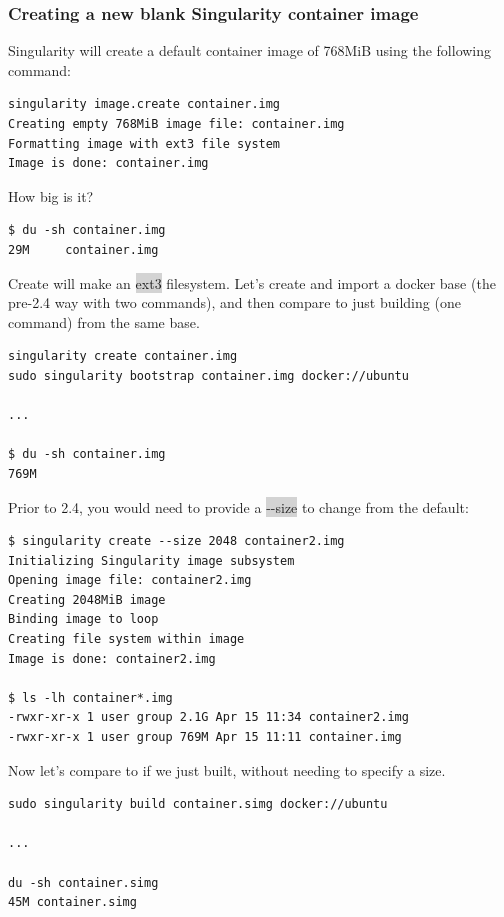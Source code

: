 \documentclass[a4paper]{article}
\begin{document}
	\subsubsection{Creating a new blank Singularity container image}
	
	Singularity will create a default container image of 768MiB using the following command:
	
\begin{lstlisting}[frame=single]
singularity image.create container.img
Creating empty 768MiB image file: container.img
Formatting image with ext3 file system
Image is done: container.img
\end{lstlisting}	
	
How big is it? \\[0.1in]

\begin{lstlisting}[frame=single]
$ du -sh container.img 
29M     container.img
\end{lstlisting}	

Create will make an  \colorbox{lightgray}{ext3} filesystem. Let’s create and import a docker base (the pre-2.4 way with two commands), and then compare to just building (one command) from the same base.

\begin{lstlisting}[frame=single]
singularity create container.img
sudo singularity bootstrap container.img docker://ubuntu

...

$ du -sh container.img 
769M
\end{lstlisting}

Prior to 2.4, you would need to provide a \colorbox{lightgray}{-{}-size} to change from the default:
\begin{lstlisting}[frame=single]
$ singularity create --size 2048 container2.img
Initializing Singularity image subsystem
Opening image file: container2.img
Creating 2048MiB image
Binding image to loop
Creating file system within image
Image is done: container2.img

$ ls -lh container*.img 
-rwxr-xr-x 1 user group 2.1G Apr 15 11:34 container2.img
-rwxr-xr-x 1 user group 769M Apr 15 11:11 container.img
\end{lstlisting}

Now let’s compare to if we just built, without needing to specify a size.

\begin{lstlisting}[frame=single]
sudo singularity build container.simg docker://ubuntu

...

du -sh container.simg
45M	container.simg
\end{lstlisting}
\end{document}
